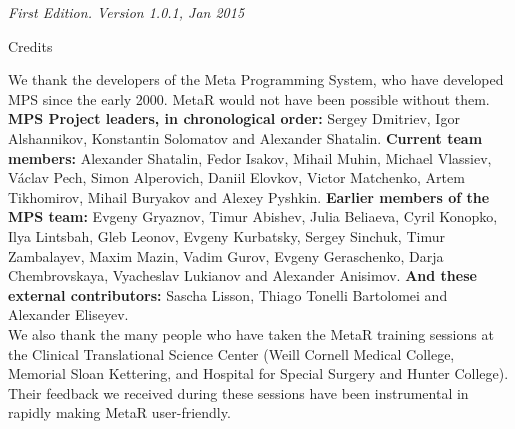 \documentclass[11pt,fleqn]{book} %
\begin{document}
\noindent \textit{
{First Edition.} Version 1.0.1, Jan 2015} %

{\newpage\thispagestyle{empty}\hbox{}}

\newpage\thispagestyle{empty}
\begin{empty}
\begin{center}\Large{Credits}\end{center}
\normalsize 
\hspace*{1cm} We thank the developers of the Meta Programming System, who have developed MPS since the early 2000. MetaR would not have been possible without them. \\
\noindent\textbf{MPS Project leaders, in chronological order:}  Sergey Dmitriev,  Igor Alshannikov, Konstantin Solomatov and Alexander Shatalin. \textbf{Current team members:} Alexander Shatalin, Fedor Isakov, Mihail Muhin, Michael Vlassiev, Václav Pech, Simon Alperovich, Daniil Elovkov, Victor Matchenko, Artem Tikhomirov, Mihail Buryakov and Alexey Pyshkin. \textbf{Earlier members of the MPS team:} Evgeny Gryaznov, Timur Abishev, Julia Beliaeva, Cyril Konopko, Ilya Lintsbah, Gleb Leonov, Evgeny Kurbatsky, Sergey Sinchuk, Timur Zambalayev, Maxim Mazin, Vadim Gurov, Evgeny Geraschenko, Darja Chembrovskaya, Vyacheslav Lukianov and Alexander Anisimov. \textbf{And these external contributors:}  Sascha Lisson, Thiago Tonelli Bartolomei and Alexander Eliseyev.\\ 

We also thank the many people who have taken the MetaR training sessions at the Clinical Translational Science Center (Weill Cornell Medical College, Memorial Sloan Kettering, and Hospital for Special Surgery and Hunter College). Their feedback we received during these sessions have been instrumental in rapidly making MetaR user-friendly.\\

\end{empty}

{\newpage\thispagestyle{empty}\hbox{}}
\end{document}
